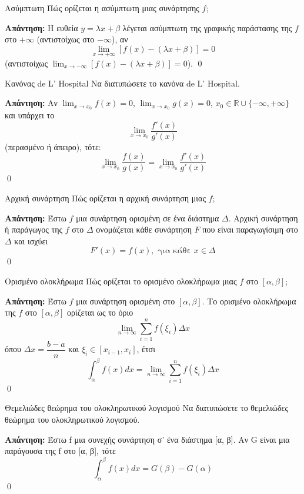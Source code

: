 \documentclass[a4paper, 12pt]{article}
\renewenvironment{proof}[1][\textbf{Απάντηση}]{%
  \par\noindent\textbf{#1:} \rmfamily}{\qed\par}
\begin{document}
\begin{theorem}{Ασύμπτωτη}
  Πώς ορίζεται η ασύμπτωτη μιας συνάρτησης $f$;
\end{theorem}
\begin{proof}
  Η ευθεία $y = λx + β$ λέγεται ασύμπτωτη της γραφικής παράστασης της $f$ στο $+\infty$ (αντιστοίχως στο $−\infty$), αν
  $$\lim_{x \to +\infty} [ f ( x) − (λ x + β )] = 0$$
  (αντιστοίχως $\lim_{x \to -\infty} [ f ( x) − (λ x + β )] = 0$).
\end{proof}

\begin{theorem}{Κανόνας de L' Hospital}
  Να διατυπώσετε το κανόνα de L' Hospital.
\end{theorem}
\begin{proof}
  Αν $\lim_{x \to x_0} f ( x) = 0$, $\lim_{x \to x_0} g ( x) = 0$, $x_0 \in \mathbb{R} \cup \{−\infty, + \infty\}$ και υπάρχει το
  $$\lim_{x \to x_0} \dfrac{f'( x)}{g' ( x)}$$
  (περασμένο ή άπειρο), τότε:
  $$\lim_{x \to x_0} \dfrac{f ( x)}{g ( x)} = \lim_{x \to x_0} \dfrac{f' ( x)}{g' ( x)}$$
\end{proof}

\begin{theorem}{Αρχική συνάρτηση}
  Πώς ορίζεται η αρχική συνάρτηση μιας $f$;
\end{theorem}
\begin{proof}
  Έστω $f$ μια συνάρτηση ορισμένη σε ένα διάστημα $Δ$. Αρχική συνάρτηση ή παράγωγος της $f$ στο $Δ$ ονομάζεται κάθε συνάρτηση $F$ που είναι παραγωγίσιμη στο $Δ$ και ισχύει
  $$F ′ (x) = f(x), \text{ για κάθε } x \in Δ$$
\end{proof}

\begin{theorem}{Ορισμένο ολοκλήρωμα}
  Πώς ορίζεται το ορισμένο ολοκλήρωμα μιας $f$ στο $[α, β]$;
\end{theorem}
\begin{proof}
  Έστω $f$ μια συνάρτηση ορισμένη στο $[α, β]$. Το ορισμένο ολοκλήρωμα της $f$ στο $[α, β]$ ορίζεται ως το όριο
  $$\lim_{n \to \infty} \sum_{i=1}^{n} f ( ξ_i ) Δx$$
  όπου $Δx = \dfrac{b - a}{n}$ και $ξ_i \in [x_{i-1}, x_i]$, έτσι
  $$\int_{α}^{β} f ( x) dx = \lim_{n \to \infty} \sum_{i=1}^{n} f ( ξ_i ) Δx$$
\end{proof}

\begin{theorem}{Θεμελιώδες θεώρημα του ολοκληρωτικού λογισμού}
  Να διατυπώσετε το θεμελιώδες θεώρημα του ολοκληρωτικού λογισμού.
\end{theorem}
\begin{proof}
  Έστω f μια συνεχής συνάρτηση σ’ ένα διάστημα [α, β]. Αν G είναι μια παράγουσα
  της f στο [α, β], τότε
  $$\int_{α}^{β} f (x) dx = G(β) − G(α)$$
\end{proof}

\printindex
\end{document}
